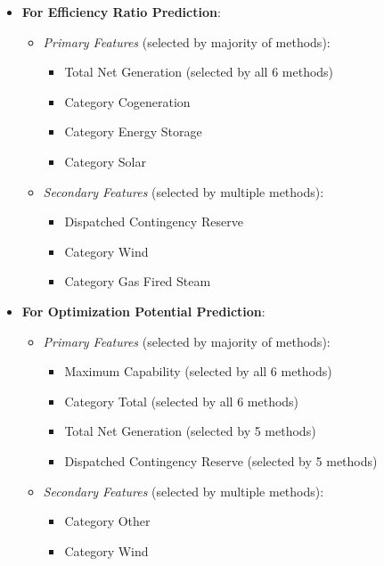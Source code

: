 \documentclass[12pt,a4paper]{article}
\begin{document}
\begin{itemize}
    \item \textbf{For Efficiency Ratio Prediction}:
    \begin{itemize}
        \item \textit{Primary Features} (selected by majority of methods):
        \begin{itemize}
            \item Total Net Generation (selected by all 6 methods)
            \item Category Cogeneration
            \item Category Energy Storage
            \item Category Solar
        \end{itemize}
        \item \textit{Secondary Features} (selected by multiple methods):
        \begin{itemize}
            \item Dispatched Contingency Reserve
            \item Category Wind
            \item Category Gas Fired Steam
        \end{itemize}
    \end{itemize}
    
    \item \textbf{For Optimization Potential Prediction}:
    \begin{itemize}
        \item \textit{Primary Features} (selected by majority of methods):
        \begin{itemize}
            \item Maximum Capability (selected by all 6 methods)
            \item Category Total (selected by all 6 methods)
            \item Total Net Generation (selected by 5 methods)
            \item Dispatched Contingency Reserve (selected by 5 methods)
        \end{itemize}
        \item \textit{Secondary Features} (selected by multiple methods):
        \begin{itemize}
            \item Category Other
            \item Category Wind
        \end{itemize}
    \end{itemize}
\end{itemize}
\end{document}
